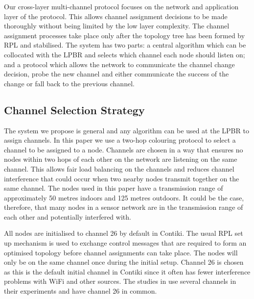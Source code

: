 Our cross-layer multi-channel protocol focuses on the network and application layer of the protocol. This allows channel assignment decisions to be made thoroughly without being limited by the low layer complexity. The channel assignment processes take place only after the topology tree has been formed by RPL and stabilised. The system
has two parts: a central algorithm which can be collocated with the LPBR and selects which channel each node should listen on; and a protocol which allows the network to communicate the channel change decision, probe the new channel and either communicate the success of the change or fall back to the previous channel. 

\subsection{Channel Selection Strategy}

The system we propose is general and any algorithm can be used at the LPBR to assign channels. In this paper we use a two-hop colouring protocol to select a channel to be assigned to a node. Channels are chosen in a way that
ensures no nodes within two hops of each other on the network are listening on the same channel.
This allows fair load balancing on the channels and reduces channel interference that could occur when two nearby nodes transmit together on the same channel. The nodes used in this paper have a transmission range of approximately 50 metres indoors and 125 metres outdoors. It could be the case, therefore, that many nodes in a sensor network are in the transmission range of each other and potentially interfered with.

All nodes are initialised to channel 26 by default in Contiki.
The usual RPL set up mechanism is used to exchange control messages that are required to form an optimised topology before channel assignments can take place. The nodes will only be on the same channel once during the initial setup. Channel 26 is chosen as this is the default initial channel in Contiki since it often has fewer interference problems with WiFi and other sources. The studies in \cite{chrysso, micmac, watteyne} use several channels in their experiments and have channel 26 in common.
	

